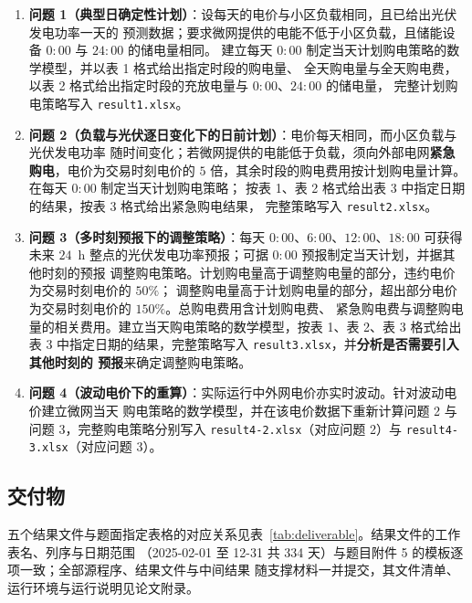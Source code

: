 \begin{enumerate}
  \item \textbf{问题 1（典型日确定性计划）}：设每天的电价与小区负载相同，且已给出光伏发电功率一天的
    预测数据；要求微网提供的电能不低于小区负载，且储能设备 \(0{:}00\) 与 \(24{:}00\) 的储电量相同。
    建立每天 \(0{:}00\) 制定当天计划购电策略的数学模型，并以表 1 格式给出指定时段的购电量、
    全天购电量与全天购电费，以表 2 格式给出指定时段的充放电量与 \(0{:}00\)、\(24{:}00\) 的储电量，
    完整计划购电策略写入 \texttt{result1.xlsx}。
  \item \textbf{问题 2（负载与光伏逐日变化下的日前计划）}：电价每天相同，而小区负载与光伏发电功率
    随时间变化；若微网提供的电能低于负载，须向外部电网\textbf{紧急购电}，电价为交易时刻电价的
    \(5\) 倍，其余时段的购电费用按计划购电量计算。在每天 \(0{:}00\) 制定当天计划购电策略；
    按表 1、表 2 格式给出表 3 中指定日期的结果，按表 3 格式给出紧急购电结果，
    完整策略写入 \texttt{result2.xlsx}。
  \item \textbf{问题 3（多时刻预报下的调整策略）}：每天 \(0{:}00\)、\(6{:}00\)、\(12{:}00\)、\(18{:}00\)
    可获得未来 \(24\)~h 整点的光伏发电功率预报；可据 \(0{:}00\) 预报制定当天计划，并据其他时刻的预报
    调整购电策略。计划购电量高于调整购电量的部分，违约电价为交易时刻电价的 \(50\%\)；
    调整购电量高于计划购电量的部分，超出部分电价为交易时刻电价的 \(150\%\)。总购电费用含计划购电费、
    紧急购电费与调整购电量的相关费用。建立当天购电策略的数学模型，按表 1、表 2、表 3 格式给出
    表 3 中指定日期的结果，完整策略写入 \texttt{result3.xlsx}，并\textbf{分析是否需要引入其他时刻的
    预报}来确定调整购电策略。
  \item \textbf{问题 4（波动电价下的重算）}：实际运行中外网电价亦实时波动。针对波动电价建立微网当天
    购电策略的数学模型，并在该电价数据下重新计算问题 2 与问题 3，完整购电策略分别写入
    \texttt{result4-2.xlsx}（对应问题 2）与 \texttt{result4-3.xlsx}（对应问题 3）。
\end{enumerate}

\subsection{交付物}

五个结果文件与题面指定表格的对应关系见表~\ref{tab:deliverable}。结果文件的工作表名、列序与日期范围
（2025-02-01 至 12-31 共 334 天）与题目附件 5 的模板逐项一致；全部源程序、结果文件与中间结果
随支撑材料一并提交，其文件清单、运行环境与运行说明见论文附录。

